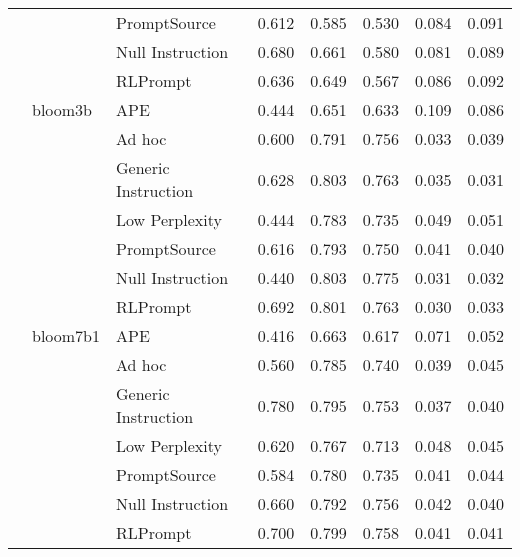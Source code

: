 \begin{supertabular}{lllrrrrr}
              &        & PromptSource &            0.612 &           0.585 &          0.530 &        0.084 &    0.091 \\
              &        & Null Instruction &            0.680 &           0.661 &          0.580 &        0.081 &    0.089 \\
              &        & RLPrompt &            0.636 &           0.649 &          0.567 &        0.086 &    0.092 \\
              & bloom3b & APE &            0.444 &           0.651 &          0.633 &        0.109 &    0.086 \\
              &        & Ad hoc &            0.600 &           0.791 &          0.756 &        0.033 &    0.039 \\
              &        & Generic Instruction &            0.628 &           0.803 &          0.763 &        0.035 &    0.031 \\
              &        & Low Perplexity &            0.444 &           0.783 &          0.735 &        0.049 &    0.051 \\
              &        & PromptSource &            0.616 &           0.793 &          0.750 &        0.041 &    0.040 \\
              &        & Null Instruction &            0.440 &           0.803 &          0.775 &        0.031 &    0.032 \\
              &        & RLPrompt &            0.692 &           0.801 &          0.763 &        0.030 &    0.033 \\
              & bloom7b1 & APE &            0.416 &           0.663 &          0.617 &        0.071 &    0.052 \\
              &        & Ad hoc &            0.560 &           0.785 &          0.740 &        0.039 &    0.045 \\
              &        & Generic Instruction &            0.780 &           0.795 &          0.753 &        0.037 &    0.040 \\
              &        & Low Perplexity &            0.620 &           0.767 &          0.713 &        0.048 &    0.045 \\
              &        & PromptSource &            0.584 &           0.780 &          0.735 &        0.041 &    0.044 \\
              &        & Null Instruction &            0.660 &           0.792 &          0.756 &        0.042 &    0.040 \\
              &        & RLPrompt &            0.700 &           0.799 &          0.758 &        0.041 &    0.041 \\

\end{supertabular}
